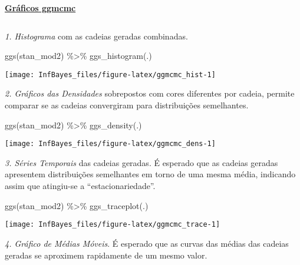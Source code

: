 \documentclass[
]{book}
\newenvironment{Shaded}{\begin{snugshade}}{\end{snugshade}}
\newcommand{\FunctionTok}[1]{\textcolor[rgb]{0.00,0.00,0.00}{#1}}
\newcommand{\NormalTok}[1]{#1}
\newcommand{\SpecialCharTok}[1]{\textcolor[rgb]{0.00,0.00,0.00}{#1}}
\begin{document}
\(~\)

\href{ggmcmc.html}{\textbf{Gráficos ggmcmc}}

\(~\)

\emph{1. Histograma} com as cadeias geradas combinadas.

\begin{Shaded}
\begin{Highlighting}[]
\FunctionTok{ggs}\NormalTok{(stan\_mod2) }\SpecialCharTok{\%\textgreater{}\%} \FunctionTok{ggs\_histogram}\NormalTok{(.)}
\end{Highlighting}
\end{Shaded}

\begin{center}\texttt{[image: InfBayes\_files/figure-latex/ggmcmc\_hist-1]} \end{center}

\emph{2. Gráficos das Densidades} sobrepostos com cores diferentes por cadeia, permite comparar se as cadeias convergiram para distribuições semelhantes.

\begin{Shaded}
\begin{Highlighting}[]
\FunctionTok{ggs}\NormalTok{(stan\_mod2) }\SpecialCharTok{\%\textgreater{}\%} \FunctionTok{ggs\_density}\NormalTok{(.)}
\end{Highlighting}
\end{Shaded}

\begin{center}\texttt{[image: InfBayes\_files/figure-latex/ggmcmc\_dens-1]} \end{center}

\emph{3. Séries Temporais} das cadeias geradas. É esperado que as cadeias geradas apresentem distribuições semelhantes em torno de uma mesma média, indicando assim que atingiu-se a ``estacionariedade''.

\begin{Shaded}
\begin{Highlighting}[]
\FunctionTok{ggs}\NormalTok{(stan\_mod2) }\SpecialCharTok{\%\textgreater{}\%} \FunctionTok{ggs\_traceplot}\NormalTok{(.)}
\end{Highlighting}
\end{Shaded}

\begin{center}\texttt{[image: InfBayes\_files/figure-latex/ggmcmc\_trace-1]} \end{center}

\emph{4. Gráfico de Médias Móveis}. É esperado que as curvas das médias das cadeias geradas se aproximem rapidamente de um mesmo valor.
\end{document}
